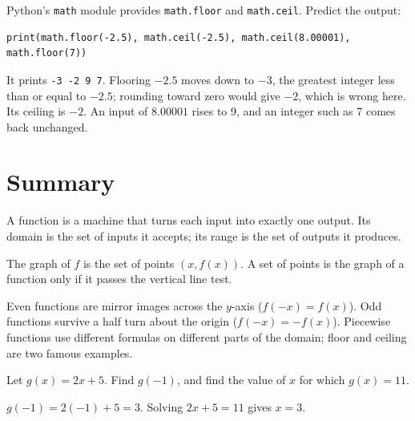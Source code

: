 \begin{Exercise}[title={Floor and ceiling in Python}, label={ex:functions-python-8}]
  Python's \texttt{math} module provides
  \texttt{math.floor} and \texttt{math.ceil}.
  Predict the output:
  \begin{verbatim}
print(math.floor(-2.5), math.ceil(-2.5), math.ceil(8.00001), math.floor(7))
  \end{verbatim}
\end{Exercise}
\begin{Answer}[ref={ex:functions-python-8}]
  It prints \texttt{-3 -2 9 7}. Flooring $-2.5$ moves down to
  $-3$, the greatest integer less than or equal to $-2.5$; rounding toward
  zero would give $-2$, which is wrong here. Its ceiling is $-2$. An input of
  $8.00001$ rises to 9, and an integer such as 7 comes back unchanged.
\end{Answer}


\section{Summary}
A function is a machine that turns each input into exactly one output. Its
domain is the set of inputs it accepts; its range is the set of outputs it
produces.

The graph of $f$ is the set of points $(x, f(x))$. A set of points is the
graph of a function only if it passes the vertical line test.

Even functions are mirror images across the $y$-axis ($f(-x) = f(x)$). Odd
functions survive a half turn about the origin ($f(-x) = -f(x)$). Piecewise
functions use different formulas on different parts of the domain; floor
and ceiling are two famous examples.

\begin{Exercise}[title={Solve for x}, label=fn1]
Let $g(x) = 2x + 5$. Find $g(-1)$, and find the value of $x$ for which $g(x) = 11$.
\end{Exercise}
\begin{Answer}[ref=fn1]
$g(-1) = 2(-1) + 5 = 3$. Solving $2x + 5 = 11$ gives $x = 3$.
\end{Answer}
